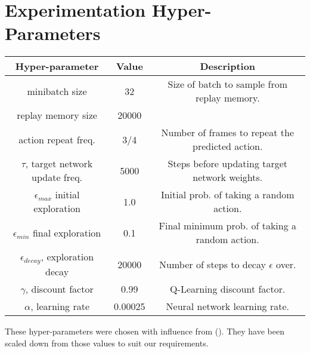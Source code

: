 \section{Experimentation Hyper-Parameters} \label{app:hparams}
\begin{center}
    \begin{tabular}{||c|c|c||}
    \hline
    Hyper-parameter  & Value & Description \\ [0.5ex]
    \hline
    \hline
    minibatch size & 32 & Size of batch to sample from replay memory. \\
    \hline
    replay memory size & 20000 & \\
    \hline
    action repeat freq. & 3/4 & Number of frames to repeat the predicted action. \\
    \hline
    $\tau$, target network update freq.  & 5000  & Steps before updating target network weights. \\
    \hline
    $\epsilon_{max}$ initial exploration & 1.0   & Initial prob. of taking a random action. \\
    \hline
    $\epsilon_{min}$ final exploration & 0.1 & Final minimum prob. of taking a random action. \\
    \hline
    $\epsilon_{decay}$, exploration decay & 20000 & Number of steps to decay $\epsilon$ over. \\
    \hline
    $\gamma$, discount factor & 0.99 & Q-Learning discount factor. \\
    \hline
    $\alpha$, learning rate & 0.00025 & Neural network learning rate. \\
    \hline
\end{tabular}
\end{center}

These hyper-parameters were chosen with influence from (\citet{human}). They have been scaled down from those values to suit our requirements.
